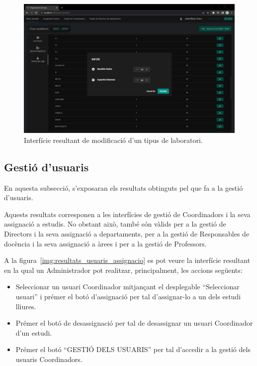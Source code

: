 \documentclass[a4paper,12pt]{ThesisStyle}
\begin{document}
\begin{figure}[H]
  \centering
  \includegraphics[width=\textwidth]{assets/results/plaDocent/modTipusLab.png}
  \caption{\label{img:resultats_plaDocent_modTipusLab}Interfície resultant de modificació d'un tipus de laboratori.}
\end{figure}

\newpage

\subsection{Gestió d'usuaris}
\label{subsec:resultats_usuaris}

En aquesta subsecció, s'exposaran els resultats obtinguts pel que fa a la gestió d'usuaris.

Aquests resultats corresponen a les interfícies de gestió de Coordinadors i la seva assignació a estudis. No obstant això, també són vàlids per a la gestió de Directors i la seva assignació a departaments, per a la gestió de Responsables de docència i la seva assignació a àrees i per a la gestió de Professors.

A la figura~\ref{img:resultats_usuaris_assignacio} es pot veure la interfície resultant en la qual un Administrador pot realitzar, principalment, les accions següents:
\begin{itemize}
  \item Seleccionar un usuari Coordinador mitjançant el desplegable ``Seleccionar usuari'' i prémer el botó d'assignació per tal d'assignar-lo a un dels estudi lliures.
  \item Prémer el botó de desassignació per tal de desassignar un usuari Coordinador d'un estudi.
  \item Prémer el botó ``GESTIÓ DELS USUARIS'' per tal d'accedir a la gestió dels usuaris Coordinadors.
\end{itemize}
\end{document}
